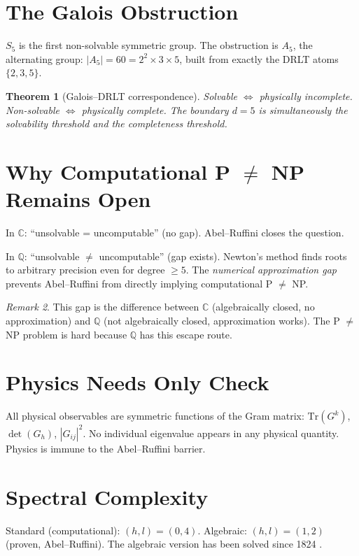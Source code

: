 \documentclass[12pt]{article}
\newtheorem{theorem}{Theorem}[section]
\theoremstyle{remark}
\newtheorem{remark}[theorem]{Remark}
\newcommand{\CC}{\mathbb{C}}
\newcommand{\QQ}{\mathbb{Q}}
\begin{document}
\section{The Galois Obstruction}

$S_5$ is the first non-solvable symmetric group.
The obstruction is $A_5$, the alternating group:
$|A_5| = 60 = 2^2 \times 3 \times 5$,
built from exactly the DRLT atoms $\{2, 3, 5\}$.

\begin{theorem}[Galois--DRLT correspondence]
Solvable $\Leftrightarrow$ physically incomplete.
Non-solvable $\Leftrightarrow$ physically complete.
The boundary $d = 5$ is simultaneously the solvability
threshold and the completeness threshold.
\end{theorem}

\section{Why Computational P $\ne$ NP Remains Open}

In $\CC$: ``unsolvable = uncomputable'' (no gap).
Abel--Ruffini closes the question.

In $\QQ$: ``unsolvable $\ne$ uncomputable'' (gap exists).
Newton's method finds roots to arbitrary precision
even for degree $\ge 5$. The \emph{numerical
approximation gap} prevents Abel--Ruffini from
directly implying computational P $\ne$ NP.

\begin{remark}
This gap is the difference between $\CC$ (algebraically
closed, no approximation) and $\QQ$ (not algebraically
closed, approximation works). The P $\ne$ NP problem
is hard because $\QQ$ has this escape route.
\end{remark}

\section{Physics Needs Only Check}

All physical observables are symmetric functions of the
Gram matrix:
$\mathrm{Tr}(G^k)$, $\det(G_h)$, $|G_{ij}|^2$.
No individual eigenvalue appears in any physical quantity.
Physics is immune to the Abel--Ruffini barrier.

\section{Spectral Complexity}

Standard (computational): $(h, l) = (0, 4)$.
Algebraic: $(h, l) = (1, 2)$ (proven, Abel--Ruffini).
The algebraic version has been solved since 1824 \cite{Paper9}.
\end{document}
